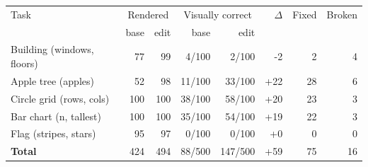 \begin{tabular}{lrrrrrrr}\toprule
Task & \multicolumn{2}{c}{Rendered} & \multicolumn{2}{c}{Visually correct} & $\Delta$ & Fixed & Broken\\
& base & edit & base & edit & & & \\\midrule
Building (windows, floors) & 77 & 99 & 4/100 & 2/100 & -2 & 2 & 4 \\
Apple tree (apples) & 52 & 98 & 11/100 & 33/100 & +22 & 28 & 6 \\
Circle grid (rows, cols) & 100 & 100 & 38/100 & 58/100 & +20 & 23 & 3 \\
Bar chart (n, tallest) & 100 & 100 & 35/100 & 54/100 & +19 & 22 & 3 \\
Flag (stripes, stars) & 95 & 97 & 0/100 & 0/100 & +0 & 0 & 0 \\
\midrule
\textbf{Total} & 424 & 494 & 88/500 & 147/500 & +59 & 75 & 16 \\
\bottomrule\end{tabular}
